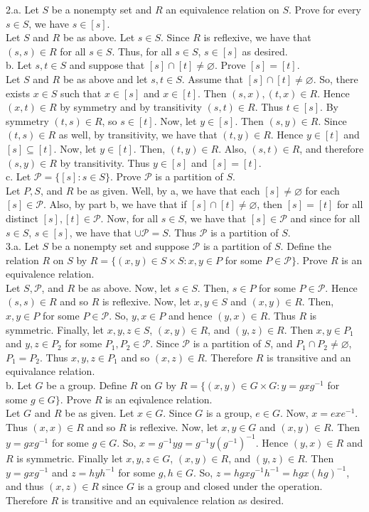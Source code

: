 \documentclass[12pt]{article}
\begin{document}
2.a. Let $S$ be a nonempty set and $R$ an equivalence relation on $S$. Prove for every $s\in S$, we have $s\in[s]$.\\
Let $S$ and $R$ be as above. Let $s\in S$. Since $R$ is reflexive, we have that $(s,s)\in R$ for all $s\in S$. Thus, for all $s\in S$, $s\in[s]$ as desired.\\
b. Let $s,t\in S$ and suppose that $[s]\cap[t]\neq\varnothing$. Prove $[s]=[t]$.\\
Let $S$ and $R$ be as above and let $s,t\in S$. Assume that $[s]\cap[t]\neq\varnothing$. So, there exists $x\in S$ such that $x\in[s]$ and $x\in[t]$. Then $(s,x),(t,x)\in R$. Hence $(x,t)\in R$ by symmetry and by transitivity $(s,t)\in R$. Thus $t\in[s]$. By symmetry $(t,s)\in R$, so $s\in[t]$. Now, let $y\in[s]$. Then $(s,y)\in R$. Since $(t,s)\in R$ as well, by transitivity, we have that $(t,y)\in R$. Hence $y\in[t]$ and $[s]\subseteq[t]$. Now, let $y\in[t]$. Then, $(t,y)\in R$. Also, $(s,t)\in R$, and therefore $(s,y)\in R$ by transitivity. Thus $y\in[s]$ and $[s]=[t]$.\\
c. Let $\mathcal{P}=\{[s]:s\in S\}$. Prove $\mathcal{P}$ is a partition of $S$.\\
Let $P, S$, and $R$ be as given. Well, by a, we have that each $[s]\neq\varnothing$ for each $[s]\in\mathcal{P}$. Also, by part b, we have that if $[s]\cap[t]\neq\varnothing$, then $[s]=[t]$ for all distinct $[s],[t]\in\mathcal{P}$. Now, for all $s\in S$, we have that $[s]\in\mathcal{P}$ and since for all $s\in S$, $s\in[s]$, we have that $\cup\mathcal{P}=S$. Thus $\mathcal{P}$ is a partition of $S$.\\[20pt]

3.a. Let $S$ be a nonempty set and suppose $\mathcal{P}$ is a partition of $S$. Define the relation $R$ on $S$ by $R=\{(x,y)\in S\times S:x,y\in P$ for some $P\in\mathcal{P}\}$. Prove $R$ is an equivalence relation.\\
Let $S, \mathcal{P}$, and $R$ be as above. Now, let $s\in S$. Then, $s\in P$ for some $P\in\mathcal{P}$. Hence $(s,s)\in R$ and so $R$ is reflexive. Now, let $x,y\in S$ and $(x,y)\in R$. Then, $x,y\in P$ for some $P\in\mathcal{P}$. So, $y,x\in P$ and hence $(y,x)\in R$. Thus $R$ is symmetric. Finally, let $x,y,z\in S$, $(x,y)\in R$, and $(y,z)\in R$. Then $x,y\in P_1$ and $y,z\in P_2$ for some $P_1,P_2\in\mathcal{P}$. Since $\mathcal{P}$ is a partition of $S$, and $P_1\cap P_2\neq\varnothing$, $P_1=P_2$. Thus $x,y,z\in P_1$ and so $(x,z)\in R$. Therefore $R$ is transitive and an equivalance relation.\\
b. Let $G$ be a group. Define $R$ on $G$ by $R=\{(x,y)\in G\times G:y=gxg^{-1}$ for some $g\in G\}$. Prove $R$ is an eqivalence relation.\\
Let $G$ and $R$ be as given. Let $x\in G$. Since $G$ is a group, $e\in G$. Now, $x=exe^{-1}$. Thus $(x,x)\in R$ and so $R$ is reflexive. Now, let $x,y\in G$ and $(x,y)\in R$. Then $y=gxg^{-1}$ for some $g\in G$. So, $x=g^{-1}yg=g^{-1}y(g^{-1})^{-1}$. Hence $(y,x)\in R$ and $R$ is symmetric. Finally let $x,y,z\in G$, $(x,y)\in R$, and $(y,z)\in R$. Then $y=gxg^{-1}$ and $z=hyh^{-1}$ for some $g,h\in G$. So, $z=hgxg^{-1}h^{-1}=hgx(hg)^{-1}$, and thus $(x,z)\in R$ since $G$ is a group and closed under the operation. Therefore $R$ is transitive and an equivalence relation as desired.
\end{document}
